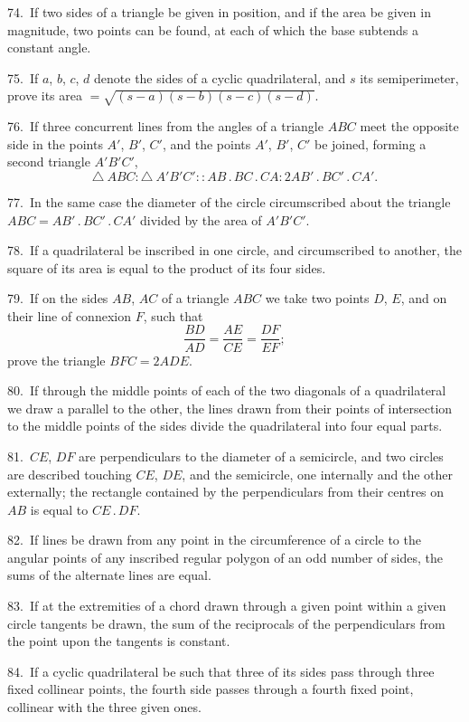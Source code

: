 \documentclass[oneside]{book}
\begin{document}
\begin{footnotesize}
74.~If two sides of a triangle
be given in position,
and if the area be given in
magnitude, two points can be found, at each of which the base
subtends a constant angle.

75.~If $a$, $b$, $c$, $d$ denote the sides of a cyclic quadrilateral, and $s$
its semiperimeter, prove its area $= \sqrt{(s-a)(s-b)(s-c)(s-d)}$.

76.~If three concurrent lines from the angles of a triangle $ABC$
meet the opposite side in the points $A'$, $B'$, $C'$, and the points
$A'$, $B'$, $C'$ be joined, forming a second triangle $A'B'C'$,
\[
\triangle\ ABC : \triangle\ A'B'C' :: AB\,.\,BC\,.\,CA : 2AB'\,.\,BC'\,.\,CA'.
\]

77.~In the same case the diameter of the circle circumscribed
about the triangle $ABC = AB'\,.\,BC'\,.\,CA'$ divided by the area of
$A'B'C'$.


78.~If a quadrilateral be inscribed in one circle, and circumscribed
to another, the square of its area is equal to the product
of its four sides.

79.~If on the sides $AB$, $AC$ of a triangle $ABC$ we take two
points $D$, $E$, and on their line of connexion $F$, such that
\[
\frac{BD}{AD}=\frac{AE}{CE}=\frac{DF}{EF};
\]
prove the triangle $BFC=2ADE$.

80.~If through the middle points of each of the two diagonals
of a quadrilateral we draw a parallel to the other, the lines drawn
from their points of intersection to the middle points of the sides
divide the quadrilateral into four equal parts.

81.~$CE$, $DF$ are perpendiculars to the diameter of a semicircle,
and two circles are described touching $CE$, $DE$, and the semicircle,
one internally and the other externally; the rectangle contained by
the perpendiculars from their centres on $AB$ is equal to $CE\,.\,DF$.

82.~If lines be drawn from any point in the circumference of a
circle to the angular points of any inscribed regular polygon of an
odd number of sides, the sums of the alternate lines are equal.

83.~If at the extremities of a chord drawn through a given
point within a given circle tangents be drawn, the sum of the
reciprocals of the perpendiculars from the point upon the tangents
is constant.

84.~If a cyclic quadrilateral be such that three of its sides pass
through three fixed collinear points, the fourth side passes through
a fourth fixed point, collinear with the three given ones.


\end{footnotesize}
\end{document}
